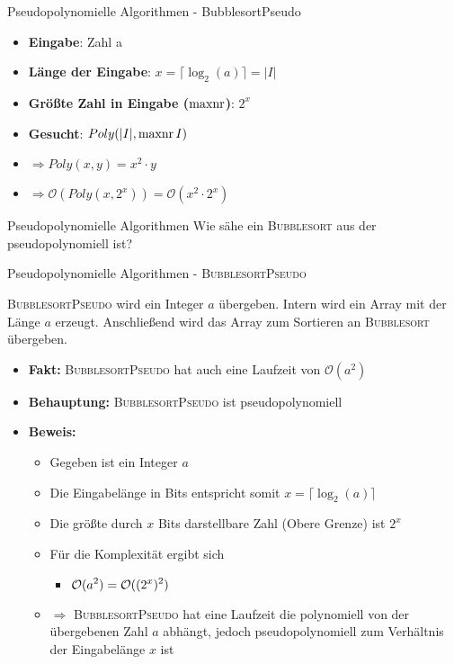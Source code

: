 \begin{frame}{Pseudopolynomielle Algorithmen - BubblesortPseudo}
\begin{itemize}
\item \textbf{Eingabe}: Zahl a
\item \textbf{Länge der Eingabe}: $x = \lceil \log_2(a)\rceil = \vert I \vert$
\item \textbf{Größte Zahl in Eingabe ($\operatorname{maxnr}$)}: $2^x$
\item \textbf{Gesucht}: $Poly(\vert I \vert, \operatorname{maxnr}{I})$
\item $\Rightarrow Poly(x,y)=x^2\cdot y$
\item $\Rightarrow \mathcal{O}(Poly(x,2^x)) = \mathcal{O}(x^2 \cdot 2^x)$
\end{itemize}
\end{frame}

\begin{frame}{Pseudopolynomielle Algorithmen}
    Wie sähe ein \textsc{Bubblesort} aus der pseudopolynomiell ist?
    
\end{frame}

\begin{frame}{Pseudopolynomielle Algorithmen - \textsc{BubblesortPseudo}}
	
	\textsc{BubblesortPseudo} wird ein Integer $a$ übergeben. Intern wird ein Array mit der Länge $a$ erzeugt. Anschließend wird das Array zum Sortieren an \textsc{Bubblesort} übergeben.
	
	\begin{itemize}
		
		\item \textbf{Fakt:} \textsc{BubblesortPseudo} hat auch eine Laufzeit von $\mathcal{O}(a^2)$
		\item \textbf{Behauptung:} \textsc{BubblesortPseudo} ist pseudopolynomiell
		\pause
		\item \textbf{Beweis:} 
		\begin{itemize}
			\item Gegeben ist ein Integer $a$ 
			\item Die Eingabelänge in Bits entspricht somit $x = \lceil \log_2(a) \rceil$
			\item Die größte durch $x$ Bits darstellbare Zahl (Obere Grenze) ist $2^x$
			\item Für die Komplexität ergibt sich
			\begin{itemize}
				\item $\displaystyle \mathcal{O}(a^2) = \mathcal{O}((2^x)^2)$
			\end{itemize}
			\item[] $\Rightarrow$ \textsc{BubblesortPseudo} hat eine Laufzeit die polynomiell von der übergebenen Zahl $a$ abhängt, jedoch pseudopolynomiell zum Verhältnis der Eingabelänge $x$ ist
		\end{itemize}
	\end{itemize}
\end{frame}

